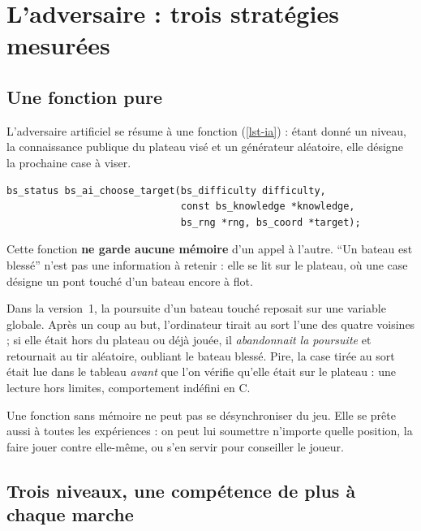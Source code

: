 \chapter{L'adversaire : trois stratégies mesurées}
\label{chap-adversaire}

\section{Une fonction pure}

L'adversaire artificiel se résume à une fonction (\cref{lst-ia}) : étant donné un niveau,
la connaissance publique du plateau visé et un générateur aléatoire, elle désigne la
prochaine case à viser.

\begin{lstlisting}[caption={L'adversaire tout entier (\fichier{include/battleship/ai.h}).},
                   label={lst-ia}]
bs_status bs_ai_choose_target(bs_difficulty difficulty,
                              const bs_knowledge *knowledge,
                              bs_rng *rng, bs_coord *target);
\end{lstlisting}

Cette fonction \textbf{ne garde aucune mémoire} d'un appel à l'autre. \enquote{Un bateau
    est blessé} n'est pas une information à retenir : elle se lit sur le plateau, où une case
 désigne un pont touché d'un bateau encore à flot.

\begin{attention}
    Dans la version~1, la poursuite d'un bateau touché reposait sur une variable globale. Après
    un coup au but, l'ordinateur tirait au sort l'une des quatre voisines ; si elle était hors
    du plateau ou déjà jouée, il \emph{abandonnait la poursuite} et retournait au tir aléatoire,
    oubliant le bateau blessé. Pire, la case tirée au sort était lue dans le tableau
    \emph{avant} que l'on vérifie qu'elle était sur le plateau : une lecture hors limites,
    comportement indéfini en C.
\end{attention}

Une fonction sans mémoire ne peut pas se désynchroniser du jeu. Elle se prête aussi à toutes
les expériences : on peut lui soumettre n'importe quelle position, la faire jouer contre
elle-même, ou s'en servir pour conseiller le joueur.

\section{Trois niveaux, une compétence de plus à chaque marche}

